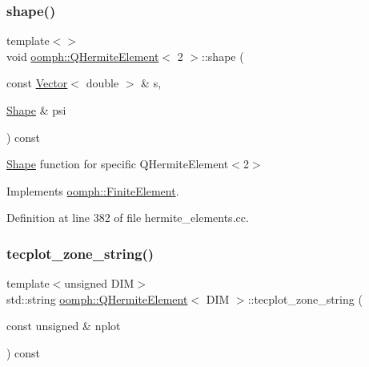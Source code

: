 \subsubsection{\texorpdfstring{shape()}{shape()}\hspace{0.1cm}{\footnotesize\ttfamily [3/3]}}
{\footnotesize\ttfamily template$<$$>$ \\
void \hyperlink{classoomph_1_1QHermiteElement}{oomph\+::\+Q\+Hermite\+Element}$<$ 2 $>$\+::shape (\begin{DoxyParamCaption}\item[{const \hyperlink{classoomph_1_1Vector}{Vector}$<$ double $>$ \&}]{s,  }\item[{\hyperlink{classoomph_1_1Shape}{Shape} \&}]{psi }\end{DoxyParamCaption}) const\hspace{0.3cm}{\ttfamily [virtual]}}



\hyperlink{classoomph_1_1Shape}{Shape} function for specific Q\+Hermite\+Element$<$2$>$ 



Implements \hyperlink{classoomph_1_1FiniteElement_a58a25b6859ddd43b7bfe64a19fee5023}{oomph\+::\+Finite\+Element}.



Definition at line 382 of file hermite\+\_\+elements.\+cc.

\mbox{\label{classoomph_1_1QHermiteElement_a29a26af721af282e5c03f93a0005ce5f}} 
\subsubsection{\texorpdfstring{tecplot\+\_\+zone\+\_\+string()}{tecplot\_zone\_string()}\hspace{0.1cm}{\footnotesize\ttfamily [1/3]}}
{\footnotesize\ttfamily template$<$unsigned D\+IM$>$ \\
std\+::string \hyperlink{classoomph_1_1QHermiteElement}{oomph\+::\+Q\+Hermite\+Element}$<$ D\+IM $>$\+::tecplot\+\_\+zone\+\_\+string (\begin{DoxyParamCaption}\item[{const unsigned \&}]{nplot }\end{DoxyParamCaption}) const\hspace{0.3cm}{\ttfamily [virtual]}}



